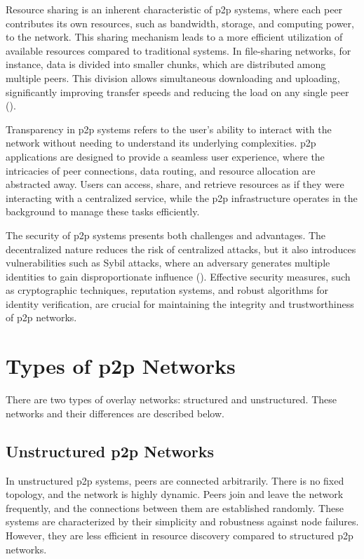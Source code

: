 Resource sharing is an inherent characteristic of \gls{p2p} systems, where each peer contributes its own resources, such as bandwidth, storage, and computing power, to the network.
This sharing mechanism leads to a more efficient utilization of available resources compared to traditional systems.
In file-sharing networks, for instance, data is divided into smaller chunks, which are distributed among multiple peers.
This division allows simultaneous downloading and uploading, significantly improving transfer speeds and reducing the load on any single peer (\cite{cohen2003incentives}).

Transparency in \gls{p2p} systems refers to the user's ability to interact with the network without needing to understand its underlying complexities.
\gls{p2p} applications are designed to provide a seamless user experience, where the intricacies of peer connections, data routing, and resource allocation are abstracted away.
Users can access, share, and retrieve resources as if they were interacting with a centralized service, while the \gls{p2p} infrastructure operates in the background to manage these tasks efficiently.

The security of \gls{p2p} systems presents both challenges and advantages.
The decentralized nature reduces the risk of centralized attacks, but it also introduces vulnerabilities such as Sybil attacks, where an adversary generates multiple identities to gain disproportionate influence (\cite{Douceur2002}).
Effective security measures, such as cryptographic techniques, reputation systems, and robust algorithms for identity verification, are crucial for maintaining the integrity and trustworthiness of \gls{p2p} networks.

\section{Types of \gls{p2p} Networks}
There are two types of overlay networks: structured and unstructured.
These networks and their differences are described below.
\subsection*{Unstructured \gls{p2p} Networks}
In unstructured \gls{p2p} systems, peers are connected arbitrarily.
There is no fixed topology, and the network is highly dynamic.
Peers join and leave the network frequently, and the connections between them are established randomly.
These systems are characterized by their simplicity and robustness against node failures.
However, they are less efficient in resource discovery compared to structured \gls{p2p} networks.

